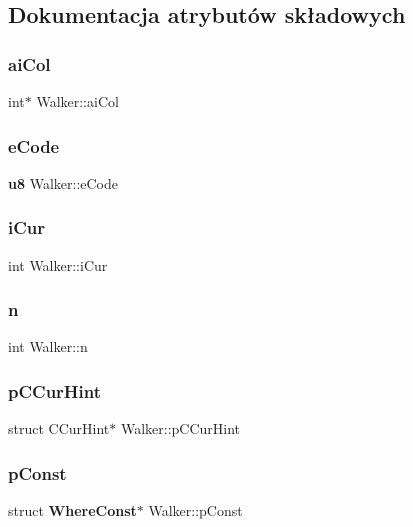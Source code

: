 \subsection{Dokumentacja atrybutów składowych}
\mbox{\label{struct_walker_abf7a6262dd1656e813b150a46c4b170e}} 
\subsubsection{aiCol}
{\footnotesize\ttfamily int$\ast$ Walker\+::ai\+Col}

\mbox{\label{struct_walker_a462e077f572efcae6a708f0640561807}} 
\subsubsection{eCode}
{\footnotesize\ttfamily \textbf{ u8} Walker\+::e\+Code}

\mbox{\label{struct_walker_afb8e209cee52c2f25e89b89bdbeb25f5}} 
\subsubsection{iCur}
{\footnotesize\ttfamily int Walker\+::i\+Cur}

\mbox{\label{struct_walker_af204341fce4aff29cd9158450226b05d}} 
\subsubsection{n}
{\footnotesize\ttfamily int Walker\+::n}

\mbox{\label{struct_walker_a70279073fa129d7495c7a88af55cf4b4}} 
\subsubsection{pCCurHint}
{\footnotesize\ttfamily struct C\+Cur\+Hint$\ast$ Walker\+::p\+C\+Cur\+Hint}

\mbox{\label{struct_walker_a14cd651397b91711f18507959398cca1}} 
\subsubsection{pConst}
{\footnotesize\ttfamily struct \textbf{ Where\+Const}$\ast$ Walker\+::p\+Const}

